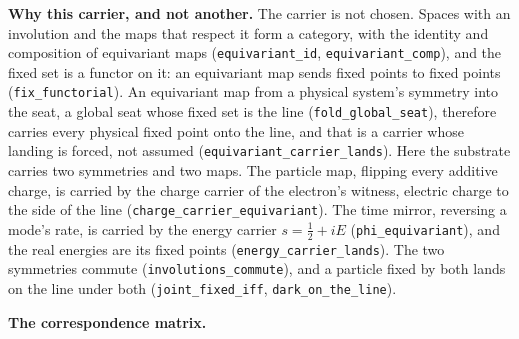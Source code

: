 \documentclass[10pt]{article}
\begin{document}
\textbf{Why this carrier, and not another.} The carrier is not chosen.
Spaces with an involution and the maps that respect it form a category,
with the identity and composition of equivariant maps
(\texttt{equivariant\_id}, \texttt{equivariant\_comp}), and the fixed
set is a functor on it: an equivariant map sends fixed points to fixed
points (\texttt{fix\_functorial}). An equivariant map from a physical
system's symmetry into the seat, a global seat whose fixed set is the
line (\texttt{fold\_global\_seat}), therefore carries every physical
fixed point onto the line, and that is a carrier whose landing is
forced, not assumed (\texttt{equivariant\_carrier\_lands}). Here the
substrate carries two symmetries and two maps. The particle map,
flipping every additive charge, is carried by the charge carrier of the
electron's witness, electric charge to the side of the line
(\texttt{charge\_carrier\_equivariant}). The time mirror, reversing a
mode's rate, is carried by the energy carrier \(s=\tfrac12+iE\)
(\texttt{phi\_equivariant}), and the real energies are its fixed points
(\texttt{energy\_carrier\_lands}). The two symmetries commute
(\texttt{involutions\_commute}), and a particle fixed by both lands on
the line under both (\texttt{joint\_fixed\_iff},
\texttt{dark\_on\_the\_line}).

\textbf{The correspondence matrix.}

\begingroup\small
\end{document}
